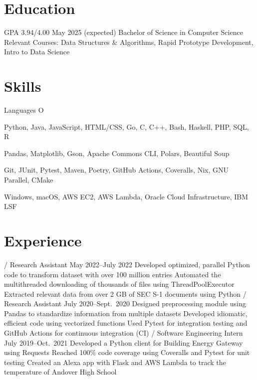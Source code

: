 \section{Education}
\begin{doutline}
     GPA 3.94/4.00
    \hfill May 2025 (expected)
        \2 Bachelor of Science in Computer Science
        \2 Relevant Courses: Data Structures \& Algorithms, Rapid Prototype Development, Intro to Data Science
\end{doutline}

\section{Skills}
\begin{labeling}{Languages O}
    \item [Languages] Python, Java, JavaScript, HTML/CSS, Go, C, C++, Bash, Haskell, PHP, SQL, R
    \item [Libraries] Pandas, Matplotlib, Gson, Apache Commons CLI, Polars, Beautiful Soup
    \item [Tools] Git, JUnit, Pytest, Maven, Poetry, GitHub Actions, Coveralls, Nix, GNU Parallel, CMake
    \item [Platforms] Windows, macOS, AWS EC2, AWS Lambda, Oracle Cloud Infrastructure, IBM LSF
\end{labeling}

\section{Experience}
\begin{doutline}
     / Research Assistant
    \hfill May 2022--July 2022
        \2 Developed optimized, parallel Python code to transform dataset with over 100 million entries
        \2 Automated the multithreaded downloading of thousands of files using ThreadPoolExecutor
        \2 Extracted relevant data from over 2 GB of SEC S-1 documents using Python
     / Research Assistant
    \hfill July 2020--Sept.\ 2020
        \2 Designed preprocessing module using Pandas to standardize information from multiple datasets
            \3 Developed idiomatic, efficient code using vectorized functions
            \3 Used Pytest for integration testing and GitHub Actions for continuous integration (CI)
     / Software Engineering Intern
    \hfill July 2019--Oct.\ 2021
        \2 Developed a Python client for Building Energy Gateway using Requests
            \3 Reached 100\% code coverage using Coveralls and Pytest for unit testing
        \2 Created an Alexa app with Flask and AWS Lambda to track the temperature of Andover High School
\end{doutline}


